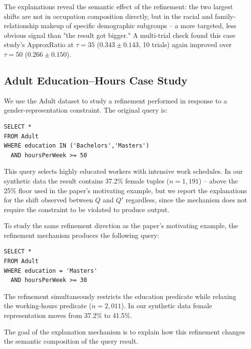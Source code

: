 The explanations reveal the semantic effect of the refinement: the two
largest shifts are not in occupation composition directly, but in the
racial and family-relationship makeup of specific demographic
subgroups -- a more targeted, less obvious signal than "the result got
bigger."
A multi-trial check found this case study's ApproxRatio at $\tau{=}35$
($0.343\pm0.143$, 10 trials) again improved over $\tau{=}50$
($0.266\pm0.150$).


\subsection{Adult Education--Hours Case Study}
\label{subsec:adult-education-hours-case-study}

We use the Adult dataset to study a refinement performed in response to
a gender-representation constraint. The original query is:

\begin{verbatim}
SELECT *
FROM Adult
WHERE education IN ('Bachelors','Masters')
  AND hoursPerWeek >= 50
\end{verbatim}

This query selects highly educated workers with intensive work schedules.
In our synthetic data the result contains 37.2\% female tuples
($n{=}1{,}191$) -- above the 25\% floor used in the paper's motivating
example, but we report the explanations for the shift observed between
$Q$ and $Q'$ regardless, since the mechanism does not require the
constraint to be violated to produce output.

To study the same refinement direction as the paper's motivating example,
the refinement mechanism produces the following query:

\begin{verbatim}
SELECT *
FROM Adult
WHERE education = 'Masters'
  AND hoursPerWeek >= 30
\end{verbatim}

The refinement simultaneously restricts the education predicate while
relaxing the working-hours predicate ($n{=}2{,}011$). In our synthetic
data female representation moves from 37.2\% to 41.5\%.

The goal of the explanation mechanism is to explain how this refinement
changes the semantic composition of the query result.

